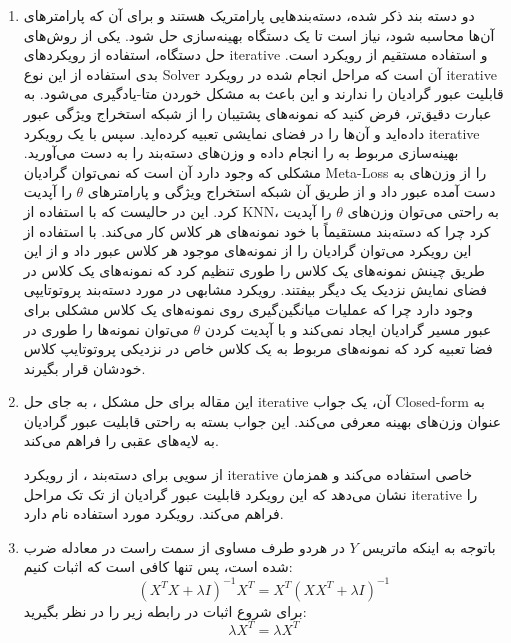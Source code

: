 \documentclass{article}
\begin{document}
\begin{enumerate}
	\item
دو دسته بند ذکر شده، دسته‌بندهایی پارامتریک هستند و برای آن که پارامترهای آن‌ها محاسبه شود، نیاز است تا یک دستگاه بهینه‌سازی حل شود. یکی از روش‌های حل دستگاه، استفاده از رویکردهای iterative و استفاده مستقیم از رویکرد 
 است. بدی استفاده از این نوع Solver آن است که مراحل انجام شده در رویکرد iterative قابلیت عبور گرادیان را ندارند و این باعث به مشکل خوردن متا-یادگیری می‌شود. به عبارت دقیق‌تر، فرض کنید که نمونه‌های پشتیبان را از شبکه استخراج ویژگی عبور داده‌اید و آن‌ها را در فضای نمایشی تعبیه کرده‌اید. سپس با یک رویکرد iterative بهینه‌سازی مربوط به 
  را انجام داده و وزن‌های دسته‌بند را به دست می‌آورید. مشکلی که وجود دارد آن است که نمی‌توان گرادیان Meta-Loss را از وزن‌های به دست آمده عبور داد و از طریق آن شبکه استخراج ویژگی و پارامترهای 
$\theta$
را آپدیت کرد. این در حالیست که با استفاده از KNN، به راحتی می‌توان وزن‌های 
$\theta$
را آپدیت کرد چرا که دسته‌بند مستقیماً با خود نمونه‌های هر کلاس کار می‌کند. با استفاده از این رویکرد می‌توان گرادیان را از نمونه‌های موجود هر کلاس عبور داد و از این طریق چینش نمونه‌های یک کلاس را طوری تنظیم کرد که نمونه‌های یک کلاس در فضای نمایش نزدیک یک دیگر بیفتند. رویکرد مشابهی در مورد دسته‌بند پروتوتایپی وجود دارد چرا که عملیات میانگین‌گیری روی نمونه‌های یک کلاس مشکلی برای عبور مسیر گرادیان ایجاد نمی‌کند و با آپدیت کردن 
$\theta$
می‌توان نمونه‌ها را طوری در فضا تعبیه کرد که نمونه‌های مربوط به یک کلاس خاص در نزدیکی پروتوتایپ کلاس خودشان قرار بگیرند.
	\item
	این مقاله برای حل مشکل
	، به جای حل iterative آن، یک جواب Closed-form به عنوان وزن‌های بهینه معرفی می‌کند. این جواب بسته به راحتی قابلیت عبور گرادیان به لایه‌های عقبی را فراهم می‌کند.
	
	از سویی برای دسته‌بند
	 ، از رویکرد iterative خاصی استفاده می‌کند و همزمان نشان می‌دهد که این رویکرد قابلیت عبور گرادیان از تک تک مراحل iterative را فراهم می‌کند. رویکرد مورد استفاده 
	نام دارد.
	
	\item
	باتوجه به اینکه ماتریس $Y$ در هردو طرف مساوی از سمت راست در معادله ضرب شده است،‌ پس تنها کافی است که اثبات کنیم:
	$$
	{\left( {{X^T}X + \lambda I} \right)^{ - 1}}{X^T} = {X^T}{\left( {X{X^T} + \lambda I} \right)^{ - 1}}
	$$
	برای شروع اثبات در رابطه زیر را در نظر بگیرید:
	$$
	\lambda {X^T} = \lambda {X^T}
	$$
	

\end{enumerate}
\end{document}
